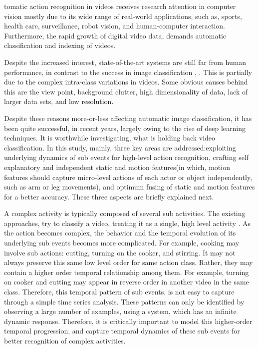 
tomatic action recognition in videos receives research attention
in computer vision mostly due to its wide range of real-world applications, such as,
sports, health care, surveillance, robot vision, and human-computer interaction.
Furthermore, the rapid growth of digital video data, demands automatic
classification and indexing of videos.





Despite the increased interest, state-of-the-art
systems are still far from human performance, in contrast to the success in image classification \cite{girshick2014rich},
 \cite{krizhevsky2012imagenet}. This is partially due to the complex intra-class variations in videos. Some
obvious causes behind this are the view point, background
clutter, high dimensionality of data, lack of larger data sets, and low resolution.

Despite these reasons more-or-less affecting automatic image classification, it has been quite successful, in recent years,
largely owing to the rise of deep learning techniques. It is worthwhile investigating,
what is holding back video classification. In this study, mainly, three key
areas are addressed:exploiting underlying dynamics of sub events for high-level action recognition, crafting
self explanatory and independent static and motion features(in which, motion features should capture micro-level actions
of each actor or object independently, such as arm or leg movements), and optimum fusing of static and motion features for a better accuracy.
These three aspects are briefly explained next.

A complex activity is typically composed of several sub activities.
The existing approaches, try to classify a video, treating it as a
single, high level activity \cite{wang2011action, wang2013action, simonyan2014two, 7486474}.
As the action becomes complex, the behavior and the
temporal evolution of its underlying sub events becomes more complicated. For example,
cooking may involve sub actions: cutting, turning on the cooker, and stirring. It may not always preserve this
same low level order for same action class. Rather, they may contain
a higher order temporal relationship among them. For example, turning on cooker and cutting
may appear in reverse order in another video in the same class.
Therefore, this temporal pattern of sub events, is not easy to capture through a simple
time series analysis. These patterns can only be identified by observing a large number
of examples, using a system, which has an infinite dynamic response. Therefore, it is critically important to
model this higher-order temporal
progression, and capture temporal dynamics of these sub events for better recognition of
complex activities.

